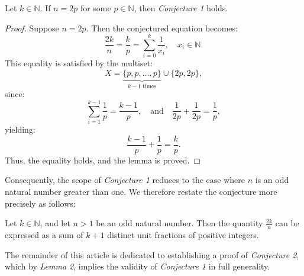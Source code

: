 \begin{lemma}
Let $k \in \mathbb{N}$. If $n = 2p$ for some $p \in \mathbb{N}$, then \emph{Conjecture 1} holds.
\end{lemma}

\begin{proof}
Suppose $n = 2p$. Then the conjectured equation becomes:
\[
\frac{2k}{n} = \frac{k}{p} = \sum_{i=0}^{k} \frac{1}{x_i}, \quad x_i \in \mathbb{N}.
\]
This equality is satisfied by the multiset:
\[
X = \underbrace{\{ p, p, \dots, p \}}_{k-1 \text{ times}} \cup \{ 2p, 2p \},
\]
since:
\[
\sum_{i=1}^{k-1} \frac{1}{p} = \frac{k-1}{p}, \quad \text{and} \quad \frac{1}{2p} + \frac{1}{2p} = \frac{1}{p},
\]
yielding:
\[
\frac{k-1}{p} + \frac{1}{p} = \frac{k}{p}.
\]
Thus, the equality holds, and the lemma is proved.
\end{proof}

Consequently, the scope of \emph{Conjecture 1} reduces to the case where $n$ is an odd natural number greater than one. We therefore restate the conjecture more precisely as follows:

\begin{conjecture}
Let $k \in \mathbb{N}$, and let $n > 1$ be an odd natural number. Then the quantity $\frac{2k}{n}$ can be expressed as a sum of $k+1$ distinct unit fractions of positive integers.
\end{conjecture}

The remainder of this article is dedicated to establishing a proof of \emph{Conjecture 2}, which by \emph{Lemma 2}, implies the validity of \emph{Conjecture 1} in full generality.